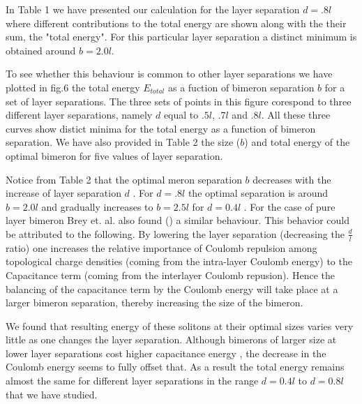   In  Table 1  we have presented our calculation  for the layer 
separation $d = .8l$ where  different contributions to the total energy
are shown along with the their sum, the "total energy".  For this particular 
layer separation a distinct minimum is obtained around $b = 2.0 l$.
 
To see whether this behaviour is common to other layer separations
 we have plotted in fig.6 the total energy 
$E_{total}$ as a fuction of bimeron
separation $b$ for a set of layer separations. 
The three sets of points in this figure corespond to three
different layer separations, namely $d$ equal to $.5l$, $.7l$ and $.8l$.
All these three curves show distict minima for the total energy as a 
function of bimeron separation. We have 
 also provided in Table 2 the size ($b$) and total energy of the optimal
bimeron for five values of layer separation.  

Notice from Table 2 that the optimal
meron separation $b$ decreases with the increase of layer separation $d$
. For $d=.8l$ 
the optimal separation 
is around $b=2.0l$ and gradually increases to $ b=2.5 l$ 
for $d=0.4l$ .  For the 
case of pure layer bimeron Brey et. al. also found (\cite{Brey})
 a similar behaviour.  
This behavior could  be attributed to the following. 
By lowering the layer separation (decreasing the $\frac{d}{l}$ ratio) one  
increases the relative importance of Coulomb repulsion 
among topological charge densities (coming from the intra-layer Coulomb 
energy)  to the Capacitance term (coming from the interlayer Coulomb 
repusion). Hence 
the balancing of the capacitance 
term by the Coulomb energy will take place at a larger  bimeron separation, 
thereby increasing  the size of the bimeron. 

 We found that  resulting energy of these solitons 
at their optimal sizes varies  very little as one changes the layer
separation. Although  bimerons of larger size at lower layer 
separations cost higher capacitance energy , the decrease in the 
Coulomb energy seems to fully offset  that. 
As a result the total energy remains 
almost the same for different  layer separations in the range $d=0.4 l$ 
 to $d= 0.8 l$ that we have studied. 


